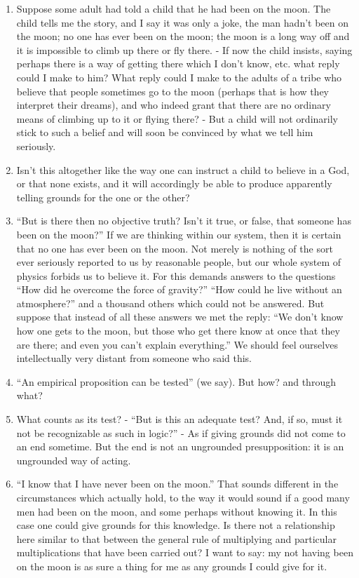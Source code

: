 \documentclass{book}
\begin{document}
\begin{enumerate}
\item
Suppose some adult had told a child that he had been on the moon. The child
tells me the story, and I say it was only a joke, the man hadn't been on the
moon; no one has ever been on the moon; the moon is a long way off and it is
impossible to climb up there or fly there. - If now the child insists, saying
perhaps there is a way of getting there which I don't know, etc. what reply
could I make to him? What reply could I make to the adults of a tribe who
believe that people sometimes go to the moon (perhaps that is how they
interpret their dreams), and who indeed grant that there are no ordinary means
of climbing up to it or flying there? - But a child will not ordinarily stick
to such a belief and will soon be convinced by what we tell him seriously.

\item
Isn't this altogether like the way one can instruct a child to believe in a
God, or that none exists, and it will accordingly be able to produce apparently
telling grounds for the one or the other?

\item
``But is there then no objective truth? Isn't it true, or false, that someone
has been on the moon?'' If we are thinking within our system, then it is
certain that no one has ever been on the moon. Not merely is nothing of the
sort ever seriously reported to us by reasonable people, but our whole system
of physics forbids us to believe it. For this demands answers to the questions
``How did he overcome the force of gravity?'' ``How could he live without an
atmosphere?'' and a thousand others which could not be answered. But suppose
that instead of all these answers we met the reply: ``We don't know how one
gets to the moon, but those who get there know at once that they are there; and
even you can't explain everything.'' We should feel ourselves intellectually
very distant from someone who said this.

\item
``An empirical proposition can be tested'' (we say). But how? and through what?

\item
What counts as its test? - ``But is this an adequate test? And, if so, must it
not be recognizable as such in logic?'' - As if giving grounds did not come to
an end sometime. But the end is not an ungrounded presupposition: it is an
ungrounded way of acting.

\item
``I know that I have never been on the moon.'' That sounds different in the
circumstances which actually hold, to the way it would sound if a good many men
had been on the moon, and some perhaps without knowing it. In this case one
could give grounds for this knowledge. Is there not a relationship here similar
to that between the general rule of multiplying and particular multiplications
that have been carried out?  I want to say: my not having been on the moon is
as sure a thing for me as any grounds I could give for it.


\end{enumerate}
\end{document}
